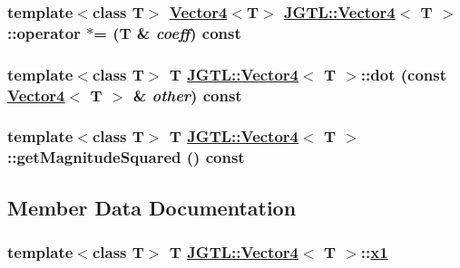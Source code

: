 \hypertarget{class_j_g_t_l_1_1_vector4_b136b349aa9aa57e8179d02ba6798f0b}{
\subsubsection[operator $\ast$=]{\setlength{\rightskip}{0pt plus 5cm}template$<$class T$>$ \hyperlink{class_j_g_t_l_1_1_vector4}{Vector4}$<$T$>$ \hyperlink{class_j_g_t_l_1_1_vector4}{JGTL::Vector4}$<$ T $>$::operator $\ast$= (T \& {\em coeff}) const}}
\label{class_j_g_t_l_1_1_vector4_b136b349aa9aa57e8179d02ba6798f0b}


\hypertarget{class_j_g_t_l_1_1_vector4_f58d72a4db1968d0096042faefbc999b}{
\subsubsection[dot]{\setlength{\rightskip}{0pt plus 5cm}template$<$class T$>$ T \hyperlink{class_j_g_t_l_1_1_vector4}{JGTL::Vector4}$<$ T $>$::dot (const \hyperlink{class_j_g_t_l_1_1_vector4}{Vector4}$<$ T $>$ \& {\em other}) const}}
\label{class_j_g_t_l_1_1_vector4_f58d72a4db1968d0096042faefbc999b}


\hypertarget{class_j_g_t_l_1_1_vector4_dcf6515607880611c34686ed8f4d34d6}{
\subsubsection[getMagnitudeSquared]{\setlength{\rightskip}{0pt plus 5cm}template$<$class T$>$ T \hyperlink{class_j_g_t_l_1_1_vector4}{JGTL::Vector4}$<$ T $>$::get\-Magnitude\-Squared () const}}
\label{class_j_g_t_l_1_1_vector4_dcf6515607880611c34686ed8f4d34d6}




\subsection{Member Data Documentation}
\hypertarget{class_j_g_t_l_1_1_vector4_b5acf73e4cff45e1aeadf1299ffe7c79}{
\subsubsection[x1]{\setlength{\rightskip}{0pt plus 5cm}template$<$class T$>$ T \hyperlink{class_j_g_t_l_1_1_vector4}{JGTL::Vector4}$<$ T $>$::\hyperlink{class_j_g_t_l_1_1_vector4_b5acf73e4cff45e1aeadf1299ffe7c79}{x1}}}
\label{class_j_g_t_l_1_1_vector4_b5acf73e4cff45e1aeadf1299ffe7c79}


